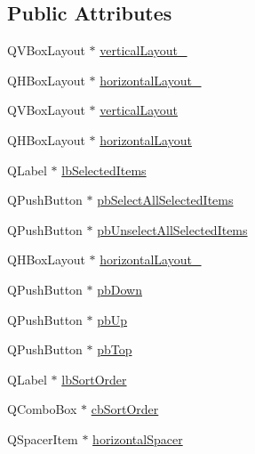 \subsection*{Public Attributes}
\begin{DoxyCompactItemize}
\item 
Q\-V\-Box\-Layout $\ast$ \hyperlink{class_ui__mdt_items_selector_dialog_a76cf24374f7a665361be0b32e97b9e03}{vertical\-Layout\-\_}
\item 
Q\-H\-Box\-Layout $\ast$ \hyperlink{class_ui__mdt_items_selector_dialog_a0337a8fd075328bbee2ce55fffd4f5b9}{horizontal\-Layout\-\_}
\item 
Q\-V\-Box\-Layout $\ast$ \hyperlink{class_ui__mdt_items_selector_dialog_a11c12aaac1f31c83dcb4d3538a9f2e43}{vertical\-Layout}
\item 
Q\-H\-Box\-Layout $\ast$ \hyperlink{class_ui__mdt_items_selector_dialog_a5c056b0287e33b9e1bcd1c80d522fc2c}{horizontal\-Layout}
\item 
Q\-Label $\ast$ \hyperlink{class_ui__mdt_items_selector_dialog_a4d76bc016714c9a3c987e1d3e180a70b}{lb\-Selected\-Items}
\item 
Q\-Push\-Button $\ast$ \hyperlink{class_ui__mdt_items_selector_dialog_a680134293d78490bd18e38774f1068d6}{pb\-Select\-All\-Selected\-Items}
\item 
Q\-Push\-Button $\ast$ \hyperlink{class_ui__mdt_items_selector_dialog_abc7b9edc742879adc682649d76ea7395}{pb\-Unselect\-All\-Selected\-Items}
\item 
Q\-H\-Box\-Layout $\ast$ \hyperlink{class_ui__mdt_items_selector_dialog_a400e7149ace7fc0dfb52e85b85072ebc}{horizontal\-Layout\-\_}
\item 
Q\-Push\-Button $\ast$ \hyperlink{class_ui__mdt_items_selector_dialog_a52172d7cd28b07d31d1a45f1e6492b7a}{pb\-Down}
\item 
Q\-Push\-Button $\ast$ \hyperlink{class_ui__mdt_items_selector_dialog_a839d192517bfb238a497bbe27b5a9234}{pb\-Up}
\item 
Q\-Push\-Button $\ast$ \hyperlink{class_ui__mdt_items_selector_dialog_a9c2ee685c32d86d376ec9ddf22e88daf}{pb\-Top}
\item 
Q\-Label $\ast$ \hyperlink{class_ui__mdt_items_selector_dialog_a92f69e7c6afb7da9a45d664ad55818ff}{lb\-Sort\-Order}
\item 
Q\-Combo\-Box $\ast$ \hyperlink{class_ui__mdt_items_selector_dialog_a770d9ca2e922f8b7a7300f59dc742935}{cb\-Sort\-Order}
\item 
Q\-Spacer\-Item $\ast$ \hyperlink{class_ui__mdt_items_selector_dialog_ab8b6cac087d50dc7afed7f1c8d367718}{horizontal\-Spacer}

\end{DoxyCompactItemize}
